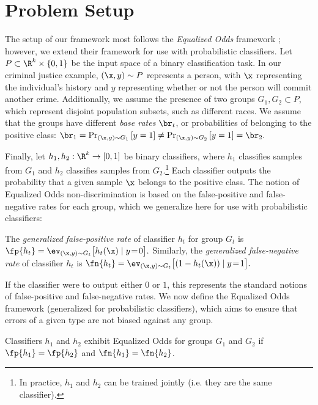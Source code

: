 
\section{Problem Setup}
\label{sec:setup}

The setup of our framework most follows the \emph{Equalized Odds}
framework \cite{hardt2016equality,zafar2017fairness}; however, we extend their framework for use with
probabilistic classifiers.
Let $P \subset \R^k \times \{0, 1\}$ be the input space of a binary classification task.
In our criminal justice example, $\left( \x, y \right) \sim P$ represents a person, with
$\x$ representing the individual's history and $y$ representing whether or not the person
will commit another crime.
%
Additionally, we assume the presence of two groups
$G_1, G_2 \subset P$,
which represent disjoint population subsets, such as different races.
We assume that the groups have different \emph{base rates} $\br_{t}$, or probabilities
of belonging to the positive class:
%
$
\br_{1} = \Pr_{(\x, y) \sim G_1} \left[ y = 1 \right] \neq \Pr_{(\x, y) \sim G_2} \left[ y = 1 \right] = \br_{2}.
$

%
Finally, let $h_1, h_2 : \R^k \rightarrow [0, 1] $ be binary classifiers,
where $h_1$ classifies samples from $G_1$ and $h_2$ classifies samples from $G_2$.\footnote{
In practice, $h_1$ and $h_2$ can be trained jointly (i.e. they are the same classifier).}
Each classifier outputs the probability that a given sample $\x$ belongs to the positive class.
The notion of Equalized Odds non-discrimination is based on the false-positive
and false-negative rates for each group, which we generalize here for use with probabilistic
classifiers:
%
\begin{definition}
  \label{def:fpfn}
  The \emph{generalized false-positive rate} of classifier $h_t$ for group $G_t$ is
  $
  \fp{h_t} = \ev_{(\x, y) \sim G_t} \bigl[ h_t(\x) \mid y\!=\!0 \bigr].
  $
  Similarly, the \emph{generalized false-negative rate} of classifier $h_t$ is
  $
    \fn{h_t} = \ev_{(\x, y) \sim G_t} \bigl[ \left( 1 - h_t(\x) \right) \mid y\!=\!1 \bigr].
  $
\end{definition}
%
If the classifier were to output either $0$ or $1$, this represents
the standard notions of false-positive and false-negative rates.
We now define the Equalized Odds framework (generalized for probabilistic classifiers),
which aims to ensure that errors of a given type are not biased against
any group.
%
\begin{definition}
  \label{def:eo}
  Classifiers $h_1$ and $h_2$ exhibit Equalized Odds for groups $G_1$
  and $G_2$ if $\fp{h_1} = \fp{h_2}$ and $\fn{h_1} = \fn{h_2}$.
\end{definition}
%
%

